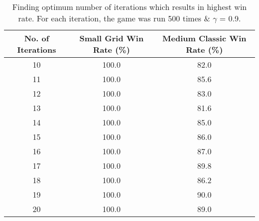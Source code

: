 \documentclass[12pt]{report}
\begin{document}
        \begin{table}[H]
          \begin{center}
            \begin{tabular}{c|c|c}
              \textbf{No. of Iterations} & \textbf{Small Grid Win Rate (\%)} & \textbf{Medium Classic Win Rate (\%)}\\
              \hline
              10 & 100.0 & 82.0 \\ %
              11 & 100.0 & 85.6 \\  %
              12 & 100.0 & 83.0 \\ %
              13 & 100.0 & 81.6 \\ %
              14 & 100.0 & 85.0 \\ %
              15 & 100.0 & 86.0\\ %
              16 & 100.0 & 87.0\\ %
              17 & 100.0 & 89.8\\ %
              18 & 100.0 & 86.2\\ %
              19 & 100.0 & 90.0\\ %
              20 & 100.0 & 89.0\\ %
            \end{tabular}
            \caption{Finding optimum number of iterations which results in highest win rate. For each iteration, the game was run 500 times \& $\gamma$ = 0.9.}
            \label{tab:table5}
          \end{center}
        \end{table}
\end{document}
